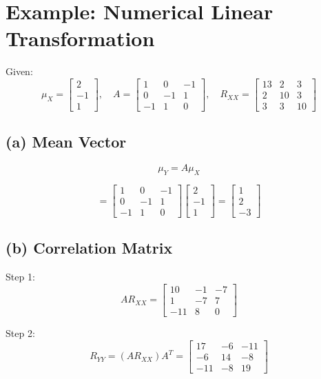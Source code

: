 \documentclass[11pt]{article}
\begin{document}
\section{Example: Numerical Linear Transformation}

Given:
\[
\mu_X =
\begin{bmatrix}
2 \\ -1 \\ 1
\end{bmatrix}, \quad
A =
\begin{bmatrix}
1 & 0 & -1 \\
0 & -1 & 1 \\
-1 & 1 & 0
\end{bmatrix}, \quad
R_{XX} =
\begin{bmatrix}
13 & 2 & 3 \\
2 & 10 & 3 \\
3 & 3 & 10
\end{bmatrix}
\]

\subsection{(a) Mean Vector}
\[
\mu_Y = A\mu_X
\]

\[
=
\begin{bmatrix}
1 & 0 & -1 \\
0 & -1 & 1 \\
-1 & 1 & 0
\end{bmatrix}
\begin{bmatrix}
2 \\ -1 \\ 1
\end{bmatrix}
=
\begin{bmatrix}
1 \\ 2 \\ -3
\end{bmatrix}
\]

\subsection{(b) Correlation Matrix}

Step 1:
\[
AR_{XX} =
\begin{bmatrix}
10 & -1 & -7 \\
1 & -7 & 7 \\
-11 & 8 & 0
\end{bmatrix}
\]

Step 2:
\[
R_{YY} = (AR_{XX})A^T =
\begin{bmatrix}
17 & -6 & -11 \\
-6 & 14 & -8 \\
-11 & -8 & 19
\end{bmatrix}
\]
\end{document}
